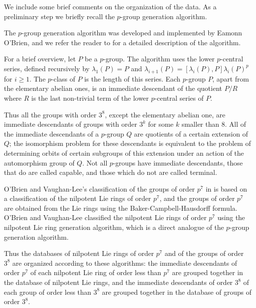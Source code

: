 

We include some brief comments on the organization of the data. As a 
preliminary step we briefly recall the $p$-group generation algorithm.


The $p$-group generation algorithm was developed and implemented by Eamonn
O'Brien, and we refer the reader to \cite{OBrien90} for a detailed
description of the algorithm. 

For a brief overview, let $P$ be a $p$-group. The algorithm uses the lower 
$p$-central series, defined recursively by $\lambda_{1}(P)=P$ and 
$\lambda_{i+1}(P)=[\lambda_{i}(P),P]\lambda_{i}(P)^{p}$ for $i\geq 1$. 
The $p$-class of $P$ is the length of this series. Each $p$-group $P$, 
apart from the elementary abelian ones, is an immediate descendant of 
the quotient $P/R$ where $R$ is the last non-trivial term of the lower 
$p$-central series of $P$. 

Thus all the groups with order $3^{8}$, except the elementary abelian one, 
are immediate descendants of groups with order $3^{k}$ for some $k$ smaller
than $8$. All of 
the immediate descendants of a $p$-group $Q$ are quotients of a certain 
extension of $Q$; the isomorphism problem for these descendants is equivalent
to the problem of determining orbits of certain subgroups of this extension 
under an action of the automorphism group of $Q$. Not all $p$-groups have 
immediate descendants, those that do are called capable, and those which 
do not are called terminal. 

O'Brien and Vaughan-Lee's classification of the groups of order $p^{7}$ 
in \cite{OVL05} is based on a classification of the nilpotent Lie rings of 
order $p^{7}$, and the groups of order $p^{7}$ are obtained from the Lie 
rings using the Baker-Campbell-Hausdorff formula. O'Brien and Vaughan-Lee 
classified the nilpotent Lie rings of order $p^{7}$ using the nilpotent 
Lie ring generation algorithm, which is a direct analogue of the $p$-group 
generation algorithm. 

Thus the databases of nilpotent Lie rings of order 
$p^{7}$ and of the groups of order $3^{8}$ are organized according to these 
algorithms: the immediate descendants of order $p^{7}$ of each nilpotent 
Lie ring of order less than $p^{7}$ are grouped together in the database of 
nilpotent Lie rings, and the immediate descendants of order $3^{8}$ of each 
group of order less than $3^{8}$ are grouped together in the database of 
groups of order $3^{8}$.

